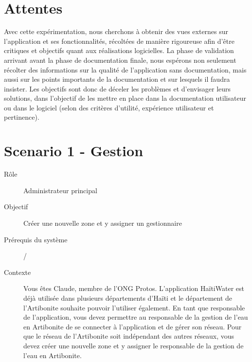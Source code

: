 \documentclass[a4paper, 11pt]{article}
\begin{document}
\section{Attentes}
    Avec cette expérimentation, nous cherchons à obtenir des vues externes sur l'application et ses fonctionnalités, récoltées de manière rigoureuse afin d'être critiques et objectifs quant aux réalisations logicielles. La phase de validation arrivant avant la phase de documentation finale, nous espérons non seulement récolter des informations sur la qualité de l'application sans documentation, mais aussi sur les points importants de la documentation et sur lesquels il faudra insister. Les objectifs sont donc de déceler les problèmes et d'envisager leurs solutions, dans l'objectif de les mettre en place dans la documentation utilisateur ou dans le logiciel (selon des critères d'utilité, expérience utilisateur et pertinence).

\newpage
\section*{Scenario 1 - Gestion}
    \begin{description}
        \item[Rôle] Administrateur principal
        \item[Objectif] Créer une nouvelle zone et y assigner un gestionnaire
        \item[Prérequis du système] /
        \item[Contexte] Vous êtes Claude, membre de l’ONG Protos. L’application HaïtiWater est déjà utilisée dans plusieurs départements d’Haïti et le département de l’Artibonite souhaite pouvoir l’utiliser également. En tant que responsable de l’application, vous devez permettre au responsable de la gestion de l’eau en Artibonite de se connecter à l’application et de gérer son réseau. Pour que le réseau de l’Artibonite soit indépendant des autres réseaux, vous devez créer une nouvelle zone et y assigner le responsable de la gestion de l'eau en Artibonite.
    \end{description}
\end{document}
